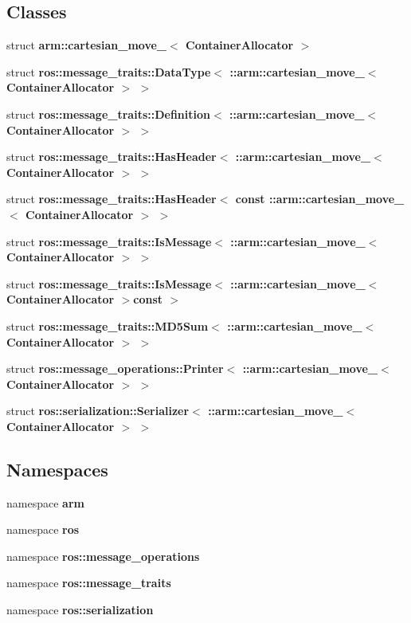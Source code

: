 \subsection*{\-Classes}
\begin{DoxyCompactItemize}
\item 
struct {\bf arm\-::cartesian\-\_\-move\-\_\-$<$ Container\-Allocator $>$}
\item 
struct {\bf ros\-::message\-\_\-traits\-::\-Data\-Type$<$ \-::arm\-::cartesian\-\_\-move\-\_\-$<$ Container\-Allocator $>$ $>$}
\item 
struct {\bf ros\-::message\-\_\-traits\-::\-Definition$<$ \-::arm\-::cartesian\-\_\-move\-\_\-$<$ Container\-Allocator $>$ $>$}
\item 
struct {\bf ros\-::message\-\_\-traits\-::\-Has\-Header$<$ \-::arm\-::cartesian\-\_\-move\-\_\-$<$ Container\-Allocator $>$ $>$}
\item 
struct {\bf ros\-::message\-\_\-traits\-::\-Has\-Header$<$ const \-::arm\-::cartesian\-\_\-move\-\_\-$<$ Container\-Allocator $>$ $>$}
\item 
struct {\bf ros\-::message\-\_\-traits\-::\-Is\-Message$<$ \-::arm\-::cartesian\-\_\-move\-\_\-$<$ Container\-Allocator $>$ $>$}
\item 
struct {\bf ros\-::message\-\_\-traits\-::\-Is\-Message$<$ \-::arm\-::cartesian\-\_\-move\-\_\-$<$ Container\-Allocator $>$const  $>$}
\item 
struct {\bf ros\-::message\-\_\-traits\-::\-M\-D5\-Sum$<$ \-::arm\-::cartesian\-\_\-move\-\_\-$<$ Container\-Allocator $>$ $>$}
\item 
struct {\bf ros\-::message\-\_\-operations\-::\-Printer$<$ \-::arm\-::cartesian\-\_\-move\-\_\-$<$ Container\-Allocator $>$ $>$}
\item 
struct {\bf ros\-::serialization\-::\-Serializer$<$ \-::arm\-::cartesian\-\_\-move\-\_\-$<$ Container\-Allocator $>$ $>$}
\end{DoxyCompactItemize}
\subsection*{\-Namespaces}
\begin{DoxyCompactItemize}
\item 
namespace {\bf arm}
\item 
namespace {\bf ros}
\item 
namespace {\bf ros\-::message\-\_\-operations}
\item 
namespace {\bf ros\-::message\-\_\-traits}
\item 
namespace {\bf ros\-::serialization}
\end{DoxyCompactItemize}
